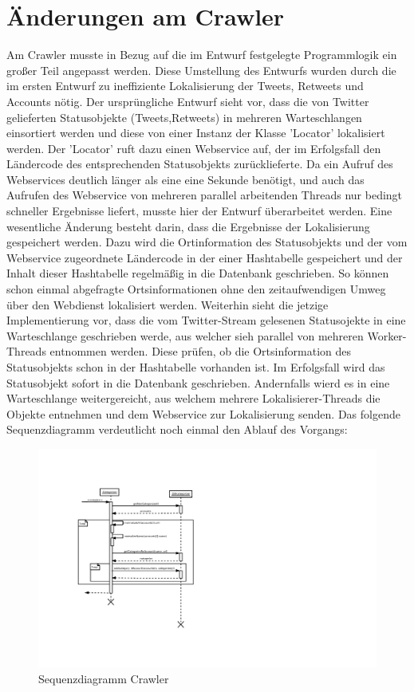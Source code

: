 \section{Änderungen am Crawler}
Am Crawler musste  in Bezug auf die im Entwurf festgelegte Programmlogik ein großer Teil angepasst werden. Diese Umstellung des Entwurfs wurden durch die im ersten Entwurf zu ineffiziente Lokalisierung der Tweets, Retweets und Accounts nötig. Der ursprüngliche Entwurf sieht vor, dass die von Twitter gelieferten Statusobjekte (Tweets,Retweets) in mehreren Warteschlangen einsortiert werden und diese von einer Instanz der Klasse 'Locator' lokalisiert werden. Der 'Locator' ruft dazu einen Webservice auf, der im Erfolgsfall den Ländercode des entsprechenden Statusobjekts zurücklieferte. Da ein Aufruf des Webservices  deutlich länger als eine eine Sekunde benötigt, und auch das Aufrufen des Webservice von mehreren parallel arbeitenden Threads nur bedingt schneller Ergebnisse liefert, musste hier der Entwurf überarbeitet werden.
Eine wesentliche Änderung besteht darin, dass die Ergebnisse der Lokalisierung gespeichert werden. Dazu wird die Ortinformation des Statusobjekts und der vom Webservice zugeordnete Ländercode in der einer Hashtabelle gespeichert und der Inhalt dieser Hashtabelle regelmäßig in die Datenbank geschrieben. So können schon einmal abgefragte Ortsinformationen ohne den zeitaufwendigen Umweg über den Webdienst lokalisiert werden. 
Weiterhin sieht die jetzige Implementierung vor, dass die vom Twitter-Stream gelesenen Statusojekte in eine Warteschlange geschrieben werde, aus welcher sieh parallel von mehreren Worker-Threads entnommen werden. Diese prüfen, ob die Ortsinformation des Statusobjekts schon in der Hashtabelle vorhanden ist. Im Erfolgsfall wird das Statusobjekt sofort in die Datenbank geschrieben. Andernfalls wierd es in eine  Warteschlange weitergereicht, aus welchem mehrere Lokalisierer-Threads die Objekte entnehmen und dem Webservice zur Lokalisierung senden.
Das folgende Sequenzdiagramm verdeutlicht noch einmal den Ablauf des Vorgangs:
\begin{figure}[h!]
	\centering
	\includegraphics[width=\textwidth,height=\textheight,keepaspectratio=true]{dia/categorizerSequence}
	\caption{Sequenzdiagramm Crawler}
	\label{fig:Crawler}
\end{figure}

